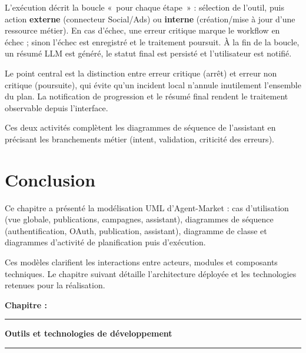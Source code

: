 \documentclass[12pt,a4paper]{report}
\numberwithin{figure}{chapter}
\numberwithin{table}{chapter}
\newcommand{\chapterpagetitle}[1]{%
  \vspace*{1.2cm}%
  {\noindent\fontsize{18}{22}\selectfont\bfseries\color{titlegreen} Chapitre \thechapter :}\par
  \vspace*{6.0cm}%
  \noindent\textcolor{darkgreen}{\rule{\textwidth}{2pt}}%
  \vspace{1.5cm}%
  \begin{center}
    {\fontsize{24}{28}\selectfont\bfseries\color{titlegreen} #1}%
  \end{center}
  \vspace{1.5cm}%
  \noindent\textcolor{darkgreen}{\rule{\textwidth}{2pt}}%
  \vfill
  \newpage
}
\begin{document}
L’exécution décrit la boucle «~pour chaque étape~» : sélection de l’outil, puis action \textbf{externe} (connecteur Social/Ads) ou \textbf{interne} (création/mise à jour d’une ressource métier). En cas d’échec, une erreur critique marque le workflow en échec ; sinon l’échec est enregistré et le traitement poursuit. À la fin de la boucle, un résumé LLM est généré, le statut final est persisté et l’utilisateur est notifié.

Le point central est la distinction entre erreur critique (arrêt) et erreur non critique (poursuite), qui évite qu’un incident local n’annule inutilement l’ensemble du plan. La notification de progression et le résumé final rendent le traitement observable depuis l’interface.



Ces deux activités complètent les diagrammes de séquence de l’assistant en précisant les branchements métier (intent, validation, criticité des erreurs).


\section{Conclusion}

Ce chapitre a présenté la modélisation UML d’Agent-Market : cas d’utilisation (vue globale, publications, campagnes, assistant), diagrammes de séquence (authentification, OAuth, publication, assistant), diagramme de classe et diagrammes d’activité de planification puis d’exécution.

Ces modèles clarifient les interactions entre acteurs, modules et composants techniques. Le chapitre suivant détaille l’architecture déployée et les technologies retenues pour la réalisation.

\newpage




\chapterpagetitle{Outils et technologies de développement}

\end{document}
